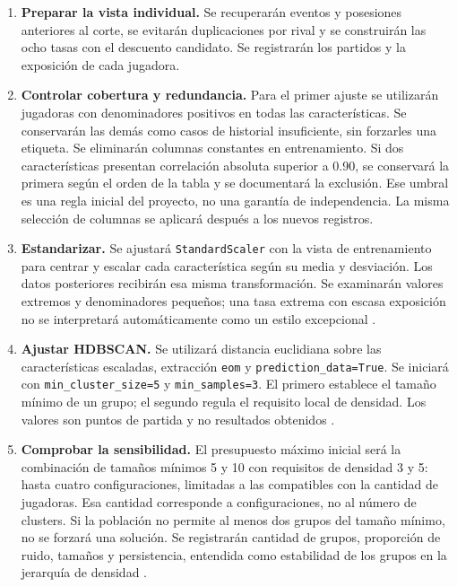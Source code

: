 \begin{enumerate}
\item \textbf{Preparar la vista individual.} Se recuperarán eventos y posesiones anteriores al corte, se evitarán duplicaciones por rival y se construirán las ocho tasas con el descuento candidato. Se registrarán los partidos y la exposición de cada jugadora.
\item \textbf{Controlar cobertura y redundancia.} Para el primer ajuste se utilizarán jugadoras con denominadores positivos en todas las características. Se conservarán las demás como casos de historial insuficiente, sin forzarles una etiqueta. Se eliminarán columnas constantes en entrenamiento. Si dos características presentan correlación absoluta superior a 0.90, se conservará la primera según el orden de la tabla y se documentará la exclusión. Ese umbral es una regla inicial del proyecto, no una garantía de independencia. La misma selección de columnas se aplicará después a los nuevos registros.
\item \textbf{Estandarizar.} Se ajustará \texttt{StandardScaler} con la vista de entrenamiento para centrar y escalar cada característica según su media y desviación. Los datos posteriores recibirán esa misma transformación. Se examinarán valores extremos y denominadores pequeños; una tasa extrema con escasa exposición no se interpretará automáticamente como un estilo excepcional \cite{sklearnScalerPerfiles}.
\item \textbf{Ajustar HDBSCAN.} Se utilizará distancia euclidiana sobre las características escaladas, extracción \texttt{eom} y \texttt{prediction\_\allowbreak data=True}. Se iniciará con \texttt{min\_\allowbreak cluster\_\allowbreak size=5} y \texttt{min\_\allowbreak samples=3}. El primero establece el tamaño mínimo de un grupo; el segundo regula el requisito local de densidad. Los valores son puntos de partida y no resultados obtenidos \cite{hdbscanAPIPerfiles}.
\item \textbf{Comprobar la sensibilidad.} El presupuesto máximo inicial será la combinación de tamaños mínimos 5 y 10 con requisitos de densidad 3 y 5: hasta cuatro configuraciones, limitadas a las compatibles con la cantidad de jugadoras. Esa cantidad corresponde a configuraciones, no al número de clusters. Si la población no permite al menos dos grupos del tamaño mínimo, no se forzará una solución. Se registrarán cantidad de grupos, proporción de ruido, tamaños y persistencia, entendida como estabilidad de los grupos en la jerarquía de densidad \cite{hdbscanParametrosPerfiles}.
\end{enumerate}

